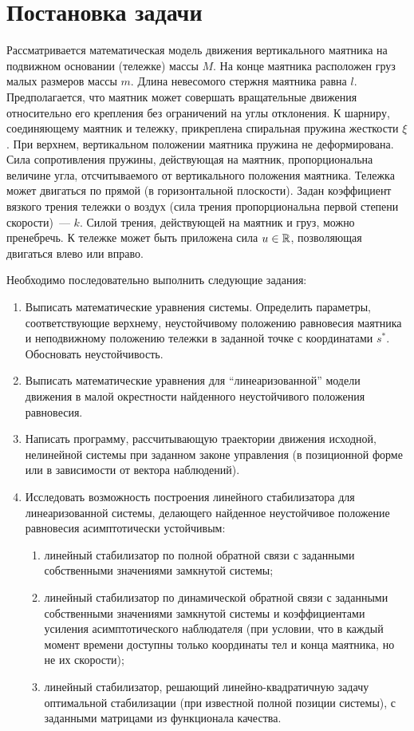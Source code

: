 \section{Постановка задачи}

Рассматривается математическая модель движения вертикального маятника на подвижном основании (тележке) массы $M$.
На конце маятника расположен груз малых размеров массы $m$.
Длина невесомого стержня маятника равна $l$.
Предполагается, что маятник может совершать вращательные движения относительно его крепления без ограничений на углы отклонения.
К шарниру, соединяющему маятник и тележку, прикреплена спиральная пружина жесткости $\xi$.
При верхнем, вертикальном положении маятника пружина не деформирована.
Сила сопротивления пружины, действующая на маятник, пропорциональна величине угла, отсчитываемого от вертикального положения маятника. Тележка может двигаться по прямой (в горизонтальной плоскости). Задан коэффициент вязкого трения тележки о воздух (сила трения пропорциональна первой степени скорости)~--- $k$. Силой трения, действующей на маятник и груз, можно пренебречь. К тележке может быть приложена сила $u \in \mathbb{R}$, позволяющая двигаться влево или вправо.

Необходимо последовательно выполнить следующие задания:
\begin{enumerate}
	\item
Выписать математические уравнения системы.
Определить параметры, соответствующие верхнему, неустойчивому положению равновесия маятника и неподвижному положению тележки в заданной точке с координатами $s^*$.
Обосновать неустойчивость.
	\item
Выписать математические уравнения для ``линеаризованной'' модели движения в малой окрестности найденного неустойчивого положения равновесия.
	\item
Написать программу, рассчитывающую траектории движения исходной, нелинейной системы при заданном законе управления (в позиционной форме или в зависимости от вектора наблюдений).
	\item
Исследовать возможность построения линейного стабилизатора для линеаризованной системы, делающего найденное неустойчивое положение равновесия асимптотически устойчивым:
	\begin{enumerate}
		\item
линейный стабилизатор по полной обратной связи с заданными собственными значениями замкнутой системы;
		\item
линейный стабилизатор по динамической обратной связи с заданными собственными значениями замкнутой системы и коэффициентами усиления асимптотического наблюдателя (при условии, что в каждый момент времени доступны только координаты тел и конца маятника, но не их скорости);
		\item
линейный стабилизатор, решающий линейно-квадратичную задачу оптимальной стабилизации (при известной полной позиции системы), с заданными матрицами из функционала качества.
	\end{enumerate}
\end{enumerate}

